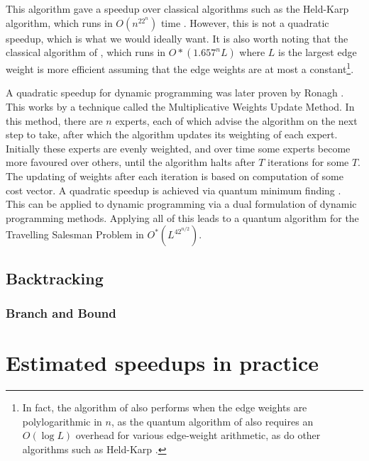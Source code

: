 This algorithm gave a speedup over classical algorithms such as the Held-Karp algorithm, which runs in $O(n^22^n)$ time \cite{held1962}. However, this is not a quadratic speedup, which is what we would ideally want. It is also worth noting that the classical algorithm of \cite{bjorklund14}, which runs in $O*(1.657^nL)$ where $L$ is the largest edge weight is more efficient assuming that the edge weights are at most a constant\footnote{In fact, the algorithm of \cite{bjorklund14} also performs when the edge weights are polylogarithmic in $n$, as the quantum algorithm of \cite{ambainis2018} also requires an $O(\log L)$ overhead for various edge-weight arithmetic, as do other algorithms such as Held-Karp \cite{held1962}.}.

A quadratic speedup for dynamic programming was later proven by Ronagh \cite{ronagh2019}. This works by a technique called the Multiplicative Weights Update Method. In this method, there are $n$ experts, each of which advise the algorithm on the next step to take, after which the algorithm updates its weighting of each expert. Initially these experts are evenly weighted, and over time some experts become more favoured over others, until the algorithm halts after $T$ iterations for some $T$. The updating of weights after each iteration is based on computation of some cost vector. A quadratic speedup is achieved via quantum minimum finding \cite{durr1996}. This can be applied to dynamic programming via a dual formulation of dynamic programming methods. Applying all of this leads to a quantum algorithm for the Travelling Salesman Problem in $O^*(L^42^{n/2})$.

\subsection{Backtracking}

\subsubsection{Branch and Bound}

\section{Estimated speedups in practice}